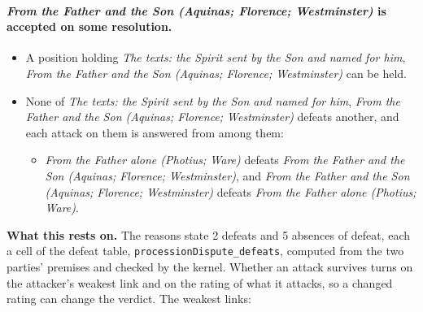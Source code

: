 \documentclass[11pt,paper=\testimonypaper,DIV=13,parskip=false]{scrartcl}
\begin{document}
\paragraph{\emph{From the Father and the Son (Aquinas; Florence; Westminster)} is accepted on some resolution.}
\begin{itemize}
\item A position holding \emph{The texts: the Spirit sent by the Son and named for him}, \emph{From the Father and the Son (Aquinas; Florence; Westminster)} can be held.
\item None of \emph{The texts: the Spirit sent by the Son and named for him}, \emph{From the Father and the Son (Aquinas; Florence; Westminster)} defeats another, and each attack on them is answered from among them:
\begin{itemize}
\item \emph{From the Father alone (Photius; Ware)} defeats \emph{From the Father and the Son (Aquinas; Florence; Westminster)}, and \emph{From the Father and the Son (Aquinas; Florence; Westminster)} defeats \emph{From the Father alone (Photius; Ware)}.
\end{itemize}
\end{itemize}
\par\noindent\textbf{What this rests on.} The reasons state 2 defeats and 5 absences of defeat, each a cell of the defeat table, \texttt{procession\allowbreak{}Dispute\_\allowbreak{}defeats}, computed from the two parties' premises and checked by the kernel. Whether an attack survives turns on the attacker's weakest link and on the rating of what it attacks, so a changed rating can change the verdict. The weakest links:
\end{document}

